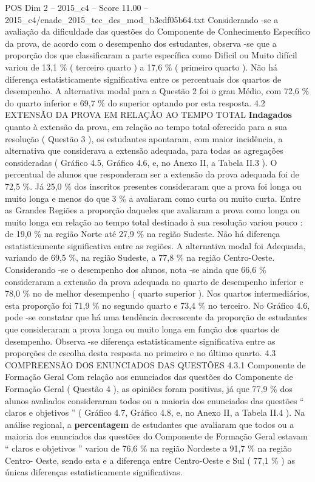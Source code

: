 \begin{textsample}{POS Dim 2 – 2015\_c4 – Score 11.00 – 2015\_c4/enade\_2015\_tec\_des\_mod\_b3edf05b64.txt}
Considerando -se a avaliação da dificuldade das questões do Componente de Conhecimento Específico da prova, de acordo com o desempenho dos estudantes, observa -se que a proporção dos que classificaram a parte específica como Difícil ou Muito difícil variou de 13,1 \% ( terceiro quarto ) a 17,6 \% ( primeiro quarto ).
Não há diferença estatisticamente significativa entre os percentuais dos quartos de desempenho.
A alternativa modal para a Questão 2 foi o grau Médio, com 72,6 \% do quarto inferior e 69,7 \% do superior optando por esta resposta. 4.2 EXTENSÃO DA PROVA EM RELAÇÃO AO TEMPO TOTAL \textbf{Indagados} quanto à extensão da prova, em relação ao tempo total oferecido para a sua resolução ( Questão 3 ), os estudantes apontaram, com maior incidência, a alternativa que considerava a extensão adequada, para todas as agregações consideradas ( Gráfico 4.5, Gráfico 4.6, e, no Anexo II, a Tabela II.3 ).
O percentual de alunos que responderam ser a extensão da prova adequada foi de 72,5 \%.
Já 25,0 \% dos inscritos presentes consideraram que a prova foi longa ou muito longa e menos do que 3 \% a avaliaram como curta ou muito curta.
Entre as Grandes Regiões a proporção daqueles que avaliaram a prova como longa ou muito longa em relação ao tempo total destinado à sua resolução variou pouco : de 19,0 \% na região Norte até 27,9 \% na região Sudeste.
Não há diferença estatisticamente significativa entre as regiões.
A alternativa modal foi Adequada, variando de 69,5 \%, na região Sudeste, a 77,8 \% na região Centro-Oeste.
Considerando -se o desempenho dos alunos, nota -se ainda que 66,6 \% consideraram a extensão da prova adequada no quarto de desempenho inferior e 78,0 \% no de melhor desempenho ( quarto superior ).
Nos quartos intermediários, esta proporção foi 71,9 \% no segundo quarto e 73,4 \% no terceiro.
No Gráfico 4.6, pode -se constatar que há uma tendência decrescente da proporção de estudantes que consideraram a prova longa ou muito longa em função dos quartos de desempenho.
Observa -se diferença estatisticamente significativa entre as proporções de escolha desta resposta no primeiro e no último quarto. 4.3 COMPREENSÃO DOS ENUNCIADOS DAS QUESTÕES 4.3.1 Componente de Formação Geral Com relação aos enunciados das questões do Componente de Formação Geral ( Questão 4 ), as opiniões foram positivas, já que 77,9 \% dos alunos avaliados consideraram todos ou a maioria dos enunciados das questões “ claros e objetivos ” ( Gráfico 4.7, Gráfico 4.8, e, no Anexo II, a Tabela II.4 ).
Na análise regional, a \textbf{percentagem} de estudantes que avaliaram que todos ou a maioria dos enunciados das questões do Componente de Formação Geral estavam “ claros e objetivos ” variou de 76,6 \% na região Nordeste a 91,7 \% na região Centro- Oeste, sendo esta e a diferença entre Centro-Oeste e Sul ( 77,1 \% ) as únicas diferenças estatisticamente significativas.

\end{textsample}

